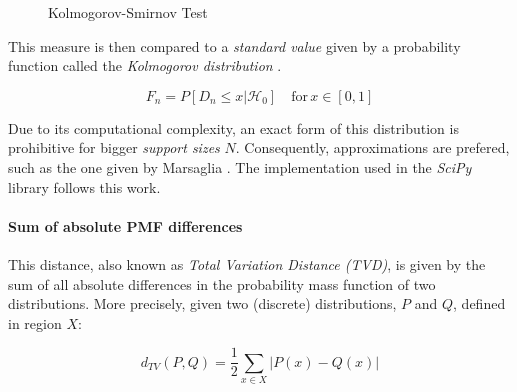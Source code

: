 \begin{figure}[h]
    \centering
    
    \caption{Kolmogorov-Smirnov Test}\label{fig:ks-test}
\end{figure}

This measure is then compared to a \textit{standard value} given by a probability function called the 
\textit{Kolmogorov distribution} \cite{marsagliaEvaluatingKolmogorovsDistribution2003}. 

\begin{equation}
    F_n = P[D_n \leq x | \mathcal{H}_0] \quad \text{for} \, x \in [0,1]
    \label{eq:ks-cdf}
\end{equation}

Due to its computational complexity, an exact form of this distribution is prohibitive for bigger \textit{support sizes} $N$.
Consequently, approximations are prefered, such as the one given by Marsaglia \cite{marsagliaEvaluatingKolmogorovsDistribution2003}.
The implementation used in the \textit{SciPy} library follows this work.


\paragraph{Sum of absolute PMF differences}
This distance, also known as \textit{Total Variation Distance (TVD)}, is given by the sum of all absolute differences in the probability mass function of two distributions. More precisely, 
given two (discrete) distributions, $P$ and $Q$, defined in region $X$:

\begin{equation}
    d_{TV}(P,Q) = \frac{1}{2} \sum_{x \in X} |P(x) - Q(x)|    
    \label{eq:total-variation}
\end{equation}

